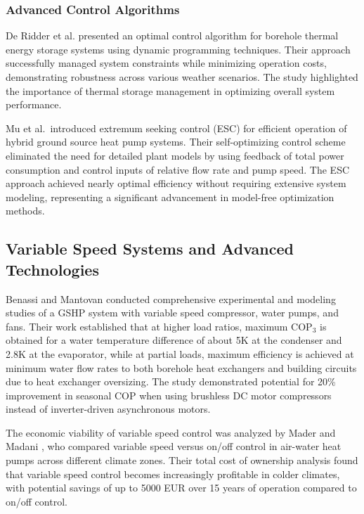 \documentclass[journal=iecr,manuscript=]{achemso}
\begin{document}
\subsubsection{Advanced Control
Algorithms}\label{advanced-control-algorithms}

De Ridder et al. \citep{de2011optimal} presented an optimal control
algorithm for borehole thermal energy storage systems using dynamic
programming techniques. Their approach successfully managed system
constraints while minimizing operation costs, demonstrating robustness
across various weather scenarios. The study highlighted the importance
of thermal storage management in optimizing overall system performance.

Mu et al.~introduced extremum seeking control (ESC) for efficient
operation of hybrid ground source heat pump systems. Their
self-optimizing control scheme eliminated the need for detailed plant
models by using feedback of total power consumption and control inputs
of relative flow rate and pump speed. The ESC approach achieved nearly
optimal efficiency without requiring extensive system modeling,
representing a significant advancement in model-free optimization
methods.

\subsection{Variable Speed Systems and Advanced
Technologies}\label{variable-speed-systems-and-advanced-technologies}

Benassi and Mantovan \citep{benassi2015energy} conducted comprehensive
experimental and modeling studies of a GSHP system with variable speed
compressor, water pumps, and fans. Their work established that at higher
load ratios, maximum \(\text{COP}_3\) is obtained for a water
temperature difference of about 5K at the condenser and 2.8K at the
evaporator, while at partial loads, maximum efficiency is achieved at
minimum water flow rates to both borehole heat exchangers and building
circuits due to heat exchanger oversizing. The study demonstrated
potential for 20\% improvement in seasonal \(\text{COP}\) when using
brushless DC motor compressors instead of inverter-driven asynchronous
motors.

The economic viability of variable speed control was analyzed by Mader
and Madani \citep{mader2014capacity}, who compared variable speed versus
on/off control in air-water heat pumps across different climate zones.
Their total cost of ownership analysis found that variable speed control
becomes increasingly profitable in colder climates, with potential
savings of up to 5000 EUR over 15 years of operation compared to on/off
control.
\end{document}
